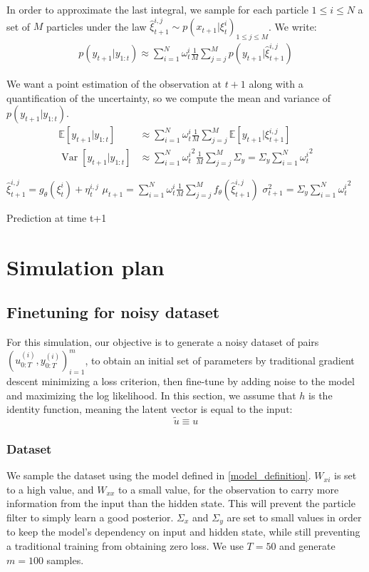 \documentclass[10pt,a4paper]{report}
\DeclareMathOperator{\Var}{Var}
\begin{document}
In order to approximate the last integral, we sample for each particle $1 \leq i \leq N$ a set of $M$ particles under the law $\hat \xi_{t+1}^{i, j} \sim p(x_{t+1}|\xi_t^i)_{1 \leq j \leq M}$.
We write:
\begin{align}
        p(y_{t+1}|y_{1:t}) \approx \sum_{i=1}^N \omega_t^i \frac{1}{M} \sum_{j=j}^M p(y_{t+1}|\hat \xi_{t+1}^{i, j})
\end{align}

We want a point estimation of the observation at $t+1$ along with a quantification of the uncertainty, so we compute the mean and variance of $p(y_{t+1}|y_{1:t})$.
\begin{align}
        \mathbb{E}[y_{t+1}|y_{1:t}] & \approx \sum_{i=1}^N \omega_t^i \frac{1}{M} \sum_{j=j}^M \mathbb{E}[y_{t+1}|\xi_{t+1}^{i, j}]                \\
        \Var[y_{t+1}|y_{1:t}]       & \approx \sum_{i=1}^N {\omega_t^i}^2 \frac{1}{M} \sum_{j=j}^M \Sigma_y = \Sigma_y \sum_{i=1}^N {\omega_t^i}^2
\end{align}

\begin{algorithm}
        $\hat \xi_{t+1}^{i, j} = g_\theta(\xi_t^i) + \eta_t^{i, j}$\;
        $\mu_{t+1} = \sum_{i=1}^N \omega_t^i \frac{1}{M} \sum_{j=j}^M f_\theta(\hat \xi_{t+1}^{i, j})$\;
        $\sigma_{t+1}^2 = \Sigma_y \sum_{i=1}^N {\omega_t^i}^2$\;
        \caption{Prediction at time {t+1}}
\end{algorithm}


\chapter{Simulation plan}
\section{Finetuning for noisy dataset}
For this simulation, our objective is to generate a noisy dataset of pairs $(u_{0:T}^{(i)}, y_{0:T}^{(i)})_{i=1}^m$, to obtain an initial set of parameters by traditional gradient descent minimizing a loss criterion, then fine-tune by adding noise to the model and maximizing the log likelihood.
In this section, we assume that $h$ is the identity function, meaning the latent vector is equal to the input:
$$
        \tilde u \equiv u
$$

\subsection{Dataset}
We sample the dataset using the model defined in \ref{model_definition}.
$W_{xi}$ is set to a high value, and $W_{xx}$ to a small value, for the observation to carry more information from the input than the hidden state.
This will prevent the particle filter to simply learn a good posterior.
$\Sigma_x$ and $\Sigma_y$ are set to small values in order to keep the model's dependency on input and hidden state, while still preventing a traditional training from obtaining zero loss.
We use $T=50$ and generate $m=100$ samples.
\end{document}
